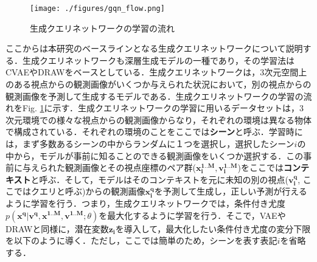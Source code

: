 \begin{figure}[tbp]
  \begin{center}
    \texttt{[image: ./figures/gqn\_flow.png]}
    \caption{生成クエリネットワークの学習の流れ}
    \label{fig:gqn_flow}
  \end{center}
\end{figure}

ここからは本研究のベースラインとなる生成クエリネットワークについて説明する．生成クエリネットワークも深層生成モデルの一種であり，その学習法はCVAEやDRAWをベースとしている．生成クエリネットワークは，3次元空間上のある視点からの観測画像がいくつか与えられた状況において，別の視点からの観測画像を予測して生成するモデルである．生成クエリネットワークの学習の流れをFig. \ref{fig:gqn_flow}に示す．生成クエリネットワークの学習に用いるデータセットは，3次元環境での様々な視点からの観測画像からなり，それぞれの環境は異なる物体で構成されている．それぞれの環境のことをここでは{\bf シーン}と呼ぶ．学習時には，まず多数あるシーンの中からランダムに１つを選択し，選択したシーン$i$の中から，モデルが事前に知ることのできる観測画像をいくつか選択する．この事前に与えられた観測画像とその視点座標のペア群($\bm{x_i^{1..M}}, \bm{v_i^{1..M}}$)をここでは{\bf コンテキスト}と呼ぶ．そして，モデルはそのコンテキストを元に未知の別の視点($\bm{v_i^q}$, ここではクエリと呼ぶ)からの観測画像$\bm{x_i^q}$を予測して生成し，正しい予測が行えるように学習を行う．つまり，生成クエリネットワークでは，条件付き尤度$p(\bm{x^q} | \bm{v^q}, \bm{x^{1..M}}, \bm{v^{1..M}} ; \theta)$を最大化するように学習を行う．そこで，VAEやDRAWと同様に，潜在変数$\bm{z_i}$を導入して，最大化したい条件付き尤度の変分下限を以下のように導く．ただし，ここでは簡単のため，シーンを表す表記$i$を省略する．

